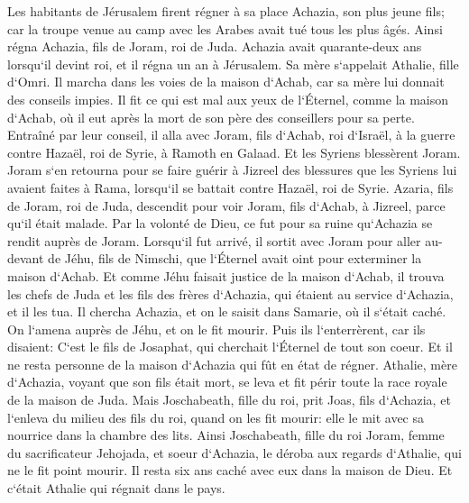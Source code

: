 \verse Les habitants de Jérusalem firent régner à sa place Achazia, son plus jeune fils; car la troupe venue au camp avec les Arabes avait tué tous les plus âgés. Ainsi régna Achazia, fils de Joram, roi de Juda. 
\verse Achazia avait quarante-deux ans lorsqu`il devint roi, et il régna un an à Jérusalem. Sa mère s`appelait Athalie, fille d`Omri. 
\verse Il marcha dans les voies de la maison d`Achab, car sa mère lui donnait des conseils impies. 
\verse Il fit ce qui est mal aux yeux de l`Éternel, comme la maison d`Achab, où il eut après la mort de son père des conseillers pour sa perte. 
\verse Entraîné par leur conseil, il alla avec Joram, fils d`Achab, roi d`Israël, à la guerre contre Hazaël, roi de Syrie, à Ramoth en Galaad. Et les Syriens blessèrent Joram. 
\verse Joram s`en retourna pour se faire guérir à Jizreel des blessures que les Syriens lui avaient faites à Rama, lorsqu`il se battait contre Hazaël, roi de Syrie. Azaria, fils de Joram, roi de Juda, descendit pour voir Joram, fils d`Achab, à Jizreel, parce qu`il était malade. 
\verse Par la volonté de Dieu, ce fut pour sa ruine qu`Achazia se rendit auprès de Joram. Lorsqu`il fut arrivé, il sortit avec Joram pour aller au-devant de Jéhu, fils de Nimschi, que l`Éternel avait oint pour exterminer la maison d`Achab. 
\verse Et comme Jéhu faisait justice de la maison d`Achab, il trouva les chefs de Juda et les fils des frères d`Achazia, qui étaient au service d`Achazia, et il les tua. 
\verse Il chercha Achazia, et on le saisit dans Samarie, où il s`était caché. On l`amena auprès de Jéhu, et on le fit mourir. Puis ils l`enterrèrent, car ils disaient: C`est le fils de Josaphat, qui cherchait l`Éternel de tout son coeur. Et il ne resta personne de la maison d`Achazia qui fût en état de régner. 
\verse Athalie, mère d`Achazia, voyant que son fils était mort, se leva et fit périr toute la race royale de la maison de Juda. 
\verse Mais Joschabeath, fille du roi, prit Joas, fils d`Achazia, et l`enleva du milieu des fils du roi, quand on les fit mourir: elle le mit avec sa nourrice dans la chambre des lits. Ainsi Joschabeath, fille du roi Joram, femme du sacrificateur Jehojada, et soeur d`Achazia, le déroba aux regards d`Athalie, qui ne le fit point mourir. 
\verse Il resta six ans caché avec eux dans la maison de Dieu. Et c`était Athalie qui régnait dans le pays. 

\chapter{}

